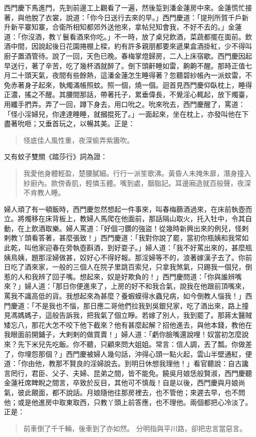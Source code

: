 西門慶下馬進門，先到前邊工上觀看了一遍，然後踅到潘金蓮房中來。金蓮慌忙接著，與他脫了衣裳，說道：「你今日送行去來的早。」西門慶道：「提刑所賀千戶新升新平寨知寨，合衛所相知都郊外送他來，拿帖兒知會我，不好不去的。」金蓮道：「你沒酒，教丫鬟看酒來你吃。」不一時，放了桌兒飲酒，菜蔬都擺在面前。飲酒中間，因說起後日花園捲棚上樑，約有許多親朋都要來遞果盒酒掛紅，少不得叫廚子置酒管待。說了一回，天色已晚。春梅掌燈歸房，二人上床宿歇。西門慶因起早送行，著了辛苦，吃了幾杯酒就醉了。倒下頭鼾睡如雷，齁齁不醒。那時正值七月二十頭天氣，夜間有些餘熱，這潘金蓮怎生睡得著？忽聽碧紗帳內一派蚊雷，不免赤著身子起來，執燭滿帳照蚊。照一個，燒一個。迴首見西門慶仰臥枕上，睡得正濃，搖之不醒。其腰間那話，帶著托子，累垂偉長，不覺淫心輒起，放下燭臺，用纖手捫弄。弄了一回，蹲下身去，用口吮之。吮來吮去，西門慶醒了，罵道：「怪小淫婦兒，你達達睡睡，就摑掍死了。」一面起來，坐在枕上，亦發叫他在下盡著吮咂；又垂首玩之，以暢其美。正是：
\begin{quote}
怪底佳人風性重，夜深偷弄紫簫吹。
\end{quote}
又有蚊子雙關《踏莎行》詞為證：
\begin{quote}
我愛他身體輕盈，楚腰膩細。行行一派笙歌沸。黃昏人未掩朱扉，潛身撞入紗廚內。款傍香肌，輕憐玉體。嘴到處，胭脂記。耳邊廂造就百般聲，夜深不肯教人睡。
\end{quote}

婦人頑了有一頓飯時，西門慶忽然想起一件事來，叫春梅篩酒過來，在床前執壺而立。將燭移在床背板上，教婦人馬爬在他面前，那話隔山取火，托入牡中，令其自動，在上飲酒取樂。婦人罵道：「好個刁鑽的強盜！從幾時新興出來的例兒，怪剌剌教丫頭看答著，甚麼張致！」西門慶道：「我對你說了罷，當初你瓶姨和我常如此乾，叫他家迎春在旁執壺斟酒，到好耍子。」婦人道：「我不好罵出來的，甚麼瓶姨鳥姨，題那淫婦做甚，奴好心不得好報。那淫婦等不的，浪著嫁漢子去了。你前日吃了酒來家，一般的三個人在院子里跳百索兒，只拿我煞氣，只踢我一個兒，倒惹的人和我辨了回子嘴。想起來，奴是好欺負的！」西門慶問道：「你與誰辨嘴來？」婦人道：「那日你便進來了，上房的好不和我合氣，說我在他跟前頂嘴來，罵我不識高低的貨。我想起來為甚麼？養蝦蟆得水蟲兒病，如今倒教人惱我！」西門慶道：「不是我也不惱，那日應二哥他們拉我到吳銀兒家，吃了酒出來，路上撞見馮媽媽子，這般告訴我，把我氣了個立睜。若嫁了別人，我到罷了。那蔣太醫賊矮忘八，那花大怎不咬下他下截來？他有甚麼起解？招他進去，與他本錢，教他在我眼面前開鋪子，大剌剌的做買賣！」婦人道：「虧你臉嘴還說哩！奴當初怎麼說來？先下米兒先吃飯。你不聽，只顧來問大姐姐。常言：信人調，丟了瓢。你做差了，你埋怨那個？」西門慶被婦人幾句話，沖得心頭一點火起，雲山半壁通紅，便道：「你由他，教那不賢良的淫婦說去。到明日休想我理他！」看官聽說：自古讒言罔行，君臣、父子、夫婦、昆弟之間，皆不能免。饒吳月娘恁般賢淑，西門慶聽金蓮衽席睥睨之間言，卒致於反目，其他可不慎哉！自是以後，西門慶與月娘尚氣，彼此覿面，都不說話。月娘隨他往那房裡去，也不管他；來遲去早，也不問他；或是他進房中取東取西，只教丫頭上前答應，也不理他。兩個都把心冷淡了。正是：
\begin{quote}
前車倒了千千輛，後車到了亦如然。
分明指與平川路，卻把忠言當惡言。
\end{quote}

